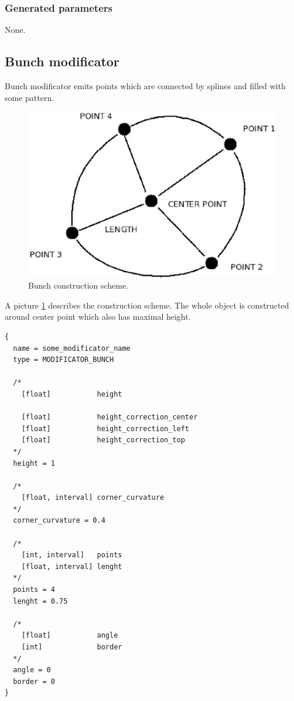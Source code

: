 \documentclass[9pt]{article}
\begin{document}
\subsubsection*{Generated parameters}

None.

\subsection{Bunch modificator}

Bunch modificator emits points which are connected by splines
and filled with some pattern. 

\begin{figure}[h]
\begin{center}
  \includegraphics[scale=0.6]{p11.eps}
  \caption{Bunch construction scheme.}
  \label{bunch_example}
\end{center}
\end{figure}

A picture \ref{bunch_example} describes the construction scheme. The whole object 
is constructed around center point which also has maximal height.

\begin{verbatim}
{
  name = some_modificator_name
  type = MODIFICATOR_BUNCH

  /*
    [float]           height
    
    [float]           height_correction_center
    [float]           height_correction_left
    [float]           height_correction_top      
  */
  height = 1
  
  /*
    [float, interval] corner_curvature
  */
  corner_curvature = 0.4
    
  /*    
    [int, interval]   points
    [float, interval] lenght
  */
  points = 4
  lenght = 0.75  
    
  /*
    [float]           angle
    [int]             border
  */  
  angle = 0
  border = 0
}
\end{verbatim}
\end{document}
